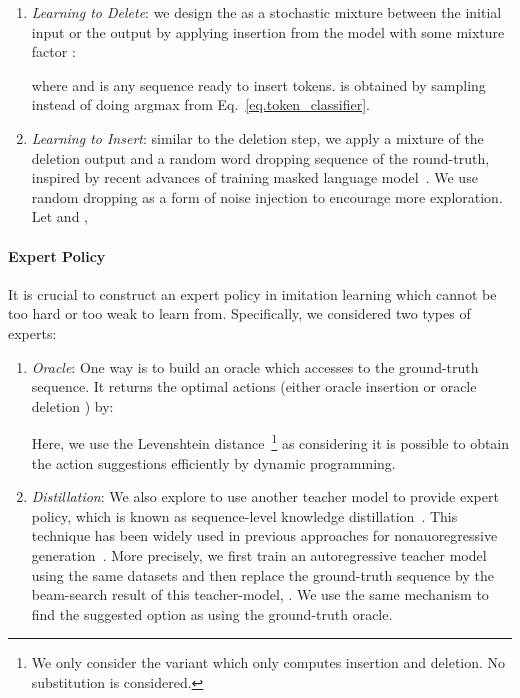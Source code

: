 \documentclass{article}
\begin{document}
\begin{enumerate}[leftmargin=*]
    \item \textit{Learning to Delete}: we design the  as a stochastic mixture between the initial input  or the output by applying insertion from the model with some mixture factor :
        
        where  and  is any sequence ready to insert tokens. 
 is obtained by sampling instead of doing argmax from Eq.~\eqref{eq.token_classifier}.
    \item \textit{Learning to Insert}: similar to the deletion step, we apply a mixture of the deletion output and a random word dropping sequence of the round-truth, inspired by recent advances of training masked language model~\citep{devlin2018bert}.
We use random dropping as a form of noise injection to encourage more exploration. 
Let  and ,
        


\end{enumerate}








\paragraph{Expert Policy}
It is crucial to construct an expert policy in imitation learning which cannot be too hard or too weak to learn from. Specifically, we considered two types of experts:
\begin{enumerate}[leftmargin=*]
    \item \textit{Oracle}: One way is to build an oracle which accesses to the ground-truth sequence. It returns the optimal actions  (either oracle insertion  or oracle deletion ) by:
    
    Here, we use the Levenshtein distance~\citep{levenshtein1965binary}\footnote{We only consider the variant which only computes insertion and deletion. No substitution is considered.} as  considering it is possible to obtain the action suggestions efficiently by dynamic programming. 
\item \textit{Distillation}: 
    We also explore to use another teacher model to provide expert policy, which is known as sequence-level knowledge distillation~\citep{kim2016sequence}.
    This technique has been widely used in previous approaches for nonauoregressive generation~\citep{gu2017non}.
More precisely, we first train an autoregressive teacher model using the same datasets and then replace the ground-truth sequence  by the beam-search result of this teacher-model, . We use the same mechanism to find the suggested option as using the ground-truth oracle.
    
    


\end{enumerate}
\end{document}
